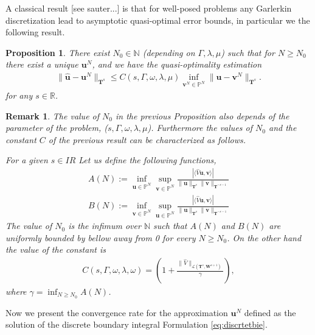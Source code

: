 \documentclass{article}
\newtheorem{proposition}[theorem]{Proposition}
\newtheorem{remark}[theorem]{Remark}
\newcommand{\todo}[1]{{\color{red}[#1]}}
\newcommand{\IN}{{\mathbb N}}
\newcommand{\IR}{{\mathbb R}}
\begin{document}
A classical result \todo{see sauter...} is that for well-posed problems any Garlerkin discretization lead to asymptotic quasi-optimal error bounds, in particular we the following result.

\begin{proposition}
\label{prop:quasiopti}
There exist $N_0 \in \IN$ (depending on $\Gamma, \lambda, \mu$) such that for $N \geq N_0$ there exist a unique $\mathbf{u}^N$, and we have the quasi-optimality estimation
\begin{align*}
\| \widehat{\mathbf{u}} - \mathbf{u}^N \|_{\mathbf{T}^s}  \leq C(s,\Gamma,\omega, \lambda, \mu) \inf_{\mathbf{v}^N \in \mathbb{P}^N} \| \widehat{\mathbf{u}} - \mathbf{v}^N \|_{\mathbf{T}^s} .
\end{align*}
for any $s \in \IR$. 
\end{proposition}

\begin{remark}
\label{rem:directconrg}
The value of $N_0$ in the previous Proposition also depends of the parameter of the problem, ($s,\Gamma,\omega, \lambda, \mu$). Furthermore the values of $N_0$ and the constant $C$ of the previous result can be characterized as follows. 

For a given $s\in IR$ Let us define the following functions, 
\begin{align*}
A(N)  := \inf_{\mathbf{u} \in \mathbb{P}^N} \sup_{\mathbf{v} \in\mathbb{P}^N } \frac{|\langle \widehat{V} \mathbf{u} , \mathbf{v} \rangle|}{ \| \mathbf{u} \|_{\mathbf{T}^s}
\|\mathbf{v} \|_{\mathbf{T}^{-s-1} }} \\ 
B(N)  := \inf_{\mathbf{v} \in \mathbb{P}^N} \sup_{\mathbf{u} \in\mathbb{P}^N } \frac{|\langle \widehat{V} \mathbf{u} , \mathbf{v} \rangle|}{ \| \mathbf{u} \|_{\mathbf{T}^s}
\|\mathbf{v} \|_{\mathbf{T}^{-s-1} }} 
\end{align*}
The value of $N_0$ is the infimum over $\IN$ such that $A(N)$ and $B(N)$ are uniformly bounded by bellow away from 0 for every $N\geq N_0$. On the other hand the value of the constant is 
\begin{align}
\label{constant:infsup}
C (s,\Gamma, \omega,\lambda,\omega) = \left( 1+ \frac{\|\widehat{V}\|_{\mathcal{L}(\mathbf{T}^s,\mathbf{W}^{s+1})}}{\gamma} \right),
\end{align}
where $\gamma = \inf_{N \geq N_0} A(N)
$.

\end{remark}

Now we present the convergence rate for the approximation $\mathbf{u}^N$ defined as the solution of the discrete boundary integral Formulation \eqref{eq:discrtetbie}. 
\end{document}
